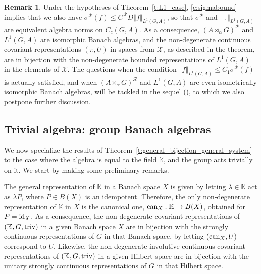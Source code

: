 \documentclass{amsart}
\theoremstyle{plain}
\theoremstyle{definition}
\newtheorem{remark}[theorem]{Remark}
\numberwithin{equation}{section}
\begin{document}
\begin{remark}
Under the hypotheses of Theorem~\ref{t:L1_case}, \eqref{e:sigmabound} implies that we also have ${\sigma^{\mathcal R}}(f)\leq {{C^{\mathcal R}}} D {\left\Vert {f} \right\Vert}_{L^1(G,A)}$, so that ${\sigma^{\mathcal R}}$ and ${\left\Vert {\,.\,} \right\Vert}_{L^1(G,A)}$ are equivalent algebra norms on $C_c(G,A)$. As a consequence, ${(A {\rtimes}_\alpha G)^\mathcal{R}}$ and $L^1(G,A)$ are isomorphic Banach algebras, and the non-degenerate continuous covariant representations ${(\pi,U)}$ in spaces from ${\mathcal X}$, as described in the theorem, are in bijection with the non-degenerate bounded representations of $L^1(G,A)$ in the elements of ${\mathcal X}$. The questions when the condition ${\left\Vert {f} \right\Vert}_{L^1(G,A)} \leq C_1 {\sigma^{\mathcal R}}(f)$ is actually satisfied, and when ${(A {\rtimes}_\alpha G)^\mathcal{R}}$ and $L^1(G,A)$ are even isometrically isomorphic Banach algebras, will be tackled in the sequel (\cite{crossedtwo}), to which we also postpone further discussion.
\end{remark}

\subsection{Trivial algebra: group Banach algebras}\label{subsec:trivial_algebra}

We now specialize the results of Theorem~\ref{t:general_bijection_general_system} to the case where the algebra is equal to the field $\mathbb K$, and the group acts trivially on it. We start by making some preliminary remarks.

The general representation of $\mathbb K$ in a Banach space $X$ is given by letting $\lambda\in \mathbb K$ act as $\lambda P$, where $P\in B(X)$ is an idempotent. Therefore, the only non-degenerate representation of $\mathbb K$ in $X$ is the canonical one, $\textup{can}_X:\mathbb K\to B(X)$, obtained for $P={\textup{id}}_X$. As a consequence, the non-degenerate covariant representations of $(\mathbb K,G,{\textup{triv}})$ in a given Banach space $X$ are in bijection with the strongly continuous representations of $G$ in that Banach space, by letting $(\textup{can}_X,U)$ correspond to $U$. Likewise, the non-degenerate involutive continuous covariant representations of $(\mathbb K,G,{\textup{triv}})$ in a given Hilbert space are in bijection with the unitary strongly continuous representations of $G$ in that Hilbert space.
\end{document}
